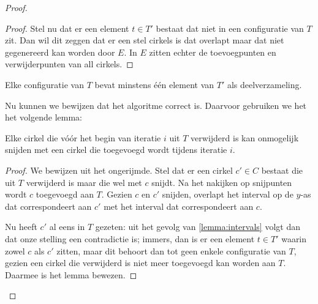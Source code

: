 \begin{proof}
\begin{proof}
Stel nu dat er een element $t \in T'$ bestaat dat niet in een
configuratie van $T$ zit. Dan wil dit zeggen dat er een stel cirkels
is dat overlapt maar dat niet gegenereerd kan worden door $E$. In $E$
zitten echter de toevoegpunten en verwijderpunten van all cirkels.

\end{proof}

\begin{gevolg}
Elke configuratie van $T$ bevat minstens \'e\'en element van $T'$ als
deelverzameling.
\label{gevolg:sweepline}
\end{gevolg}


Nu kunnen we bewijzen dat het algoritme correct is. Daarvoor gebruiken
we het het volgende lemma:

\begin{lemma}
Elke cirkel die v\'o\'or het begin van iteratie $i$ uit $T$ verwijderd is
kan onmogelijk snijden met een cirkel die toegevoegd wordt tijdens
iteratie $i$.
\label{lemma:t1}
\end{lemma}

\begin{proof}
We bewijzen uit het ongerijmde. Stel dat er een cirkel $c' \in C$
bestaat die uit $T$ verwijderd is maar die wel met $c$ snijdt. Na het
nakijken op snijpunten wordt $c$ toegevoegd aan $T$. Gezien $c$ en
$c'$ snijden, overlapt het interval op de $y$-as dat correspondeert
aan $c'$ met het interval dat correspondeert aan $c$.

Nu heeft $c'$ al eens in $T$ gezeten: uit het gevolg van
\ref{lemma:intervals} volgt dan dat onze stelling een contradictie is;
immers, dan is er een element $t \in T'$ waarin zowel $c$ als $c'$
zitten, maar dit behoort dan tot geen enkele configuratie van $T$,
gezien een cirkel die verwijderd is niet meer toegevoegd kan worden
aan $T$. Daarmee is het lemma bewezen.
\end{proof}


\end{proof}

